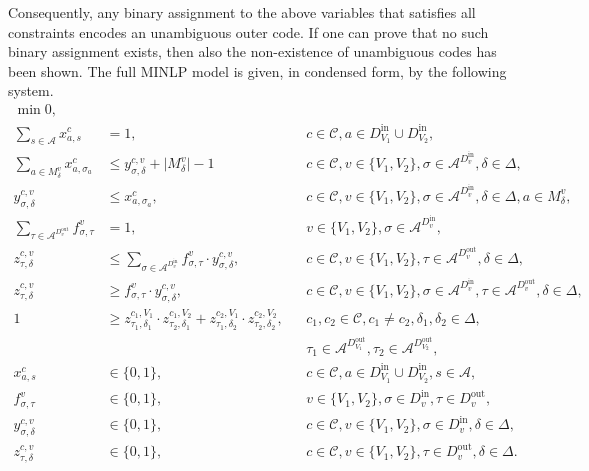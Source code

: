 \documentclass[11pt,a4paper]{article}
\theoremstyle{definition}
\begin{document}
Consequently, any binary assignment to the above variables that satisfies
all constraints encodes an unambiguous outer code.
If one can prove that no such binary assignment exists, then also the
non-existence of unambiguous codes has been shown.
The full MINLP model is given, in condensed form, by the following system.
%
\begin{align*}
  \min 0, &&&\\
  \sum_{s \in \mathcal{A}} x^c_{a,s} &= 1, &&
  c \in \mathcal{C}, a \in D^{\text{in}}_{V_1} \cup D^{\text{in}}_{V_2},\\
  \sum_{a \in M^v_\delta} x^c_{a,\sigma_a}
  &\leq
    y^{c,v}_{\sigma,\delta} + \lvert M^v_\delta \rvert - 1 &&
  c \in \mathcal{C}, v \in \{V_1,V_2\},
  \sigma \in \mathcal{A}^{D^{\text{in}}_v}, \delta \in \Delta,\\
  y^{c,v}_{\sigma,\delta}
  &\leq
    x^c_{a,\sigma_a}, &&
  c \in \mathcal{C}, v \in \{V_1,V_2\},
  \sigma \in \mathcal{A}^{D^{\text{in}}_v}, \delta \in \Delta,
  a \in M^v_\delta,\\
  \sum_{\tau \in \mathcal{A}^{D^{\text{out}}_v}} f^v_{\sigma,\tau} &= 1,&&
  v \in \{V_1,V_2\},
  \sigma \in \mathcal{A}^{D^{\text{in}}_v},\\
  z^{c,v}_{\tau,\delta}
  &\leq
    \sum_{\sigma \in \mathcal{A}^{D^{\text{in}}_v}} f^v_{\sigma,\tau} \cdot y^{c,v}_{\sigma,\delta}, &&
  c \in \mathcal{C}, v \in \{V_1,V_2\},
  \tau \in \mathcal{A}^{D^{\text{out}}_v},
  \delta \in \Delta,
  \\
  z^{c,v}_{\tau,\delta}
  &\geq
    f^v_{\sigma,\tau} \cdot y^{c,v}_{\sigma,\delta}, &&
  c \in \mathcal{C}, v \in \{V_1,V_2\},
  \sigma \in \mathcal{A}^{D^\text{in}_v}, \tau \in \mathcal{A}^{D^{\text{out}}_v},
  \delta \in \Delta,\\
  1
  &\geq
    z^{c_1,V_1}_{\tau_1,\delta_1}\cdot z^{c_1,V_2}_{\tau_2,\delta_1}
    +
    z^{c_2,V_1}_{\tau_1,\delta_2}\cdot z^{c_2,V_2}_{\tau_2,\delta_2}
    ,&&
  c_1,c_2 \in \mathcal{C}, c_1 \neq c_2,
  \delta_1,\delta_2 \in \Delta,\\
  &&&
  \tau_1 \in \mathcal{A}^{D^{\text{out}}_{V_1}}, \tau_2 \in \mathcal{A}^{D^{\text{out}}_{V_2}},\\
  x^c_{a,s} &\in \{0,1\},&&
  c \in \mathcal{C}, a \in D^{\text{in}}_{V_1} \cup D^{\text{in}}_{V_2},
  s \in \mathcal{A},\\
  f^v_{\sigma,\tau} & \in \{0,1\},&&
  v \in \{V_1,V_2\}, \sigma \in D^{\text{in}}_v, \tau\in D^{\text{out}}_v,\\
  y^{c,v}_{\sigma,\delta} &\in \{0,1\},&&
  c \in \mathcal{C},
  v \in \{V_1,V_2\}, \sigma \in D^{\text{in}}_v, \delta \in \Delta,\\
  z^{c,v}_{\tau,\delta} &\in \{0,1\}, &&
  c \in \mathcal{C},
  v \in \{V_1,V_2\}, \tau \in D^{\text{out}}_v, \delta \in \Delta.
\end{align*}
%
\end{document}

